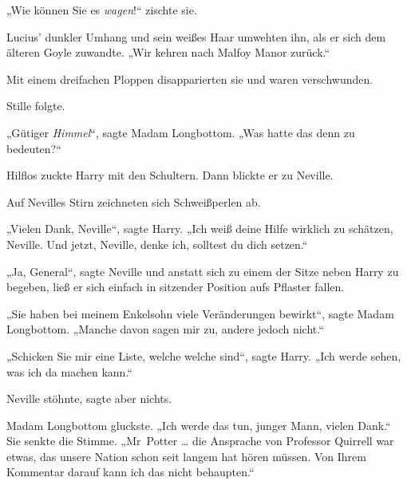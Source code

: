 „Wie können Sie es \emph{wagen}!“ zischte sie.

Lucius’ dunkler Umhang und sein weißes Haar umwehten ihn, als er sich dem älteren Goyle zuwandte.
„Wir kehren nach Malfoy Manor zurück.“

Mit einem dreifachen Ploppen disapparierten sie und waren verschwunden.

Stille folgte.

„Gütiger \emph{Himmel}“, sagte Madam Longbottom.
„Was hatte das denn zu bedeuten?“

Hilflos zuckte Harry mit den Schultern. Dann blickte er zu Neville.

Auf Nevilles Stirn zeichneten sich Schweißperlen ab.

„Vielen Dank, Neville“, sagte Harry.
„Ich weiß deine Hilfe wirklich zu schätzen, Neville. Und jetzt, Neville, denke ich, solltest du dich setzen.“

„Ja, General“, sagte Neville und anstatt sich zu einem der Sitze neben Harry zu begeben, ließ er sich einfach in sitzender Position aufs Pflaster fallen.

„Sie haben bei meinem Enkelsohn viele Veränderungen bewirkt“, sagte Madam Longbottom.
„Manche davon sagen mir zu, andere jedoch nicht.“

„Schicken Sie mir eine Liste, welche welche sind“, sagte Harry.
„Ich werde sehen, was ich da machen kann.“

Neville stöhnte, sagte aber nichts.

Madam Longbottom gluckste.
„Ich werde das tun, junger Mann, vielen Dank.“ Sie senkte die Stimme.
„Mr~Potter … die Ansprache von Professor Quirrell war etwas, das unsere Nation schon seit langem hat hören müssen. Von Ihrem Kommentar darauf kann ich das nicht behaupten.“

